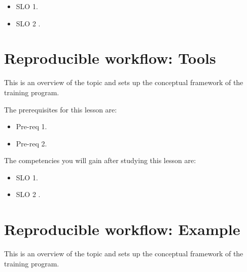 \begin{itemize}
    \item SLO 1.
\end{itemize}

\begin{itemize}
    \item SLO 2 .
\end{itemize}

\section{Reproducible workflow: Tools}
\label{sec:reproducible-workflow-tools}

This is an overview of the topic and sets up the conceptual framework of the training program.




The prerequisites for this lesson are: 




\begin{itemize}
    \item Pre-req 1.
\end{itemize}

\begin{itemize}
    \item Pre-req 2.
\end{itemize}




The competencies you will gain after studying this lesson are: 




\begin{itemize}
    \item SLO 1.
\end{itemize}

\begin{itemize}
    \item SLO 2 .
\end{itemize}

\section{Reproducible workflow: Example}
\label{sec:reproducible-workflow-example}

This is an overview of the topic and sets up the conceptual framework of the training program.




